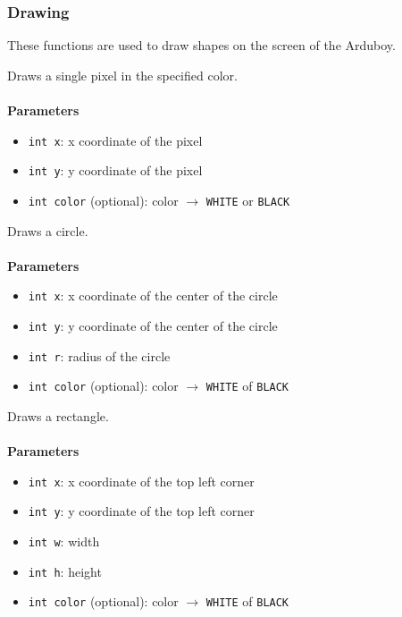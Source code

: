 \documentclass[11pt,fleqn]{book} %
\begin{document}
\subsubsection{Drawing}
These functions are used to draw shapes on the screen of the Arduboy.

\begin{libf}[drawPixel(x, y, \emph{color=WHITE})]
	Draws a single pixel in the specified color.\\ \\
	\textbf{Parameters}
	\begin{itemize}
		\item \texttt{int x}: x coordinate of the pixel
		\item \texttt{int y}: y coordinate of the pixel
		\item \texttt{int color} (optional): color $\rightarrow$ \texttt{WHITE} or \texttt{BLACK}
	\end{itemize}
\end{libf}

\begin{libf}[drawCircle(x, y, r, \emph{color=WHITE})]
	Draws a circle.\\ \\
	\textbf{Parameters}
	\begin{itemize}
		\item \texttt{int x}: x coordinate of the center of the circle
		\item \texttt{int y}: y coordinate of the center of the circle
		\item \texttt{int r}: radius of the circle
		\item \texttt{int color} (optional): color $\rightarrow$ \texttt{WHITE} of \texttt{BLACK}
	\end{itemize}
\end{libf}

\begin{libf}[drawRect(x, y, w, h, \emph{color=WHITE})]
	Draws a rectangle.\\ \\
	\textbf{Parameters}
	\begin{itemize}
		\item \texttt{int x}: x coordinate of the top left corner
		\item \texttt{int y}: y coordinate of the top left corner
		\item \texttt{int w}: width
		\item \texttt{int h}: height
		\item \texttt{int color} (optional): color $\rightarrow$ \texttt{WHITE} of \texttt{BLACK}
	\end{itemize}
\end{libf}
\end{document}
